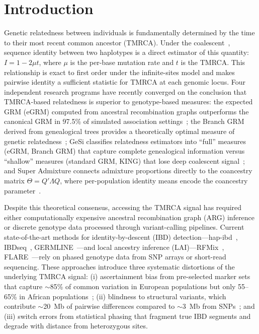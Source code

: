 \section{Introduction}
\label{sec:introduction}

Genetic relatedness between individuals is fundamentally determined by the time to their most recent common ancestor (TMRCA). Under the coalescent~\cite{kingman1982coalescent}, sequence identity between two haplotypes is a direct estimator of this quantity: $I = 1 - 2\mu t$, where $\mu$ is the per-base mutation rate and $t$ is the TMRCA. This relationship is exact to first order under the infinite-sites model and makes pairwise identity a sufficient statistic for TMRCA at each genomic locus. Four independent research programs have recently converged on the conclusion that TMRCA-based relatedness is superior to genotype-based measures: the expected GRM (eGRM) computed from ancestral recombination graphs outperforms the canonical GRM in 97.5\% of simulated association settings~\cite{fan2022egrm}; the Branch GRM derived from genealogical trees provides a theoretically optimal measure of genetic relatedness~\cite{lehmann2026branch_grm}; GeSi classifies relatedness estimators into ``full'' measures (eGRM, Branch GRM) that capture complete genealogical information versus ``shallow'' measures (standard GRM, KING) that lose deep coalescent signal~\cite{gesi2025}; and Super Admixture connects admixture proportions directly to the coancestry matrix $\Theta = Q'\Lambda Q$, where per-population identity means encode the coancestry parameter~\cite{chen2025super_admixture}.

Despite this theoretical consensus, accessing the TMRCA signal has required either computationally expensive ancestral recombination graph (ARG) inference or discrete genotype data processed through variant-calling pipelines. Current state-of-the-art methods for identity-by-descent (IBD) detection---hap-ibd~\cite{browning2020hap_ibd}, IBDseq~\cite{browning2013ibdseq}, GERMLINE~\cite{gusev2009germline}---and local ancestry inference (LAI)---RFMix~\cite{maples2013rfmix}, FLARE~\cite{browning2023flare}---rely on phased genotype data from SNP arrays or short-read sequencing. These approaches introduce three systematic distortions of the underlying TMRCA signal: (i) ascertainment bias from pre-selected marker sets that capture $\sim$85\% of common variation in European populations but only 55--65\% in African populations~\cite{lachance2012ascertainment}; (ii) blindness to structural variants, which contribute $\sim$20~Mb of pairwise differences compared to $\sim$3~Mb from SNPs~\cite{nurk2022t2t}; and (iii) switch errors from statistical phasing that fragment true IBD segments and degrade with distance from heterozygous sites.

